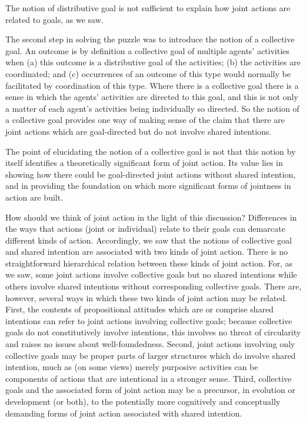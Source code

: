 \documentclass[12pt,a4paper]{extarticle}
\begin{document}
The notion of distributive goal is not sufficient to explain how joint actions are related to goals, as we saw.

The second step in solving the puzzle was to introduce the notion of a collective goal.  An outcome is by definition a collective goal of multiple agents' activities when (a) this outcome is a distributive goal of the activities; (b) the activities are coordinated; and (c)  occurrences of an outcome of this type would normally be facilitated by coordination of this type.  Where there is a collective goal there is a sense in which the agents' activities are directed to this goal, and this is not only a matter of each agent's activities being individually so directed.
So the notion of a collective goal provides one way of making sense of the claim that there are joint actions which are goal-directed but do not involve shared intentions.

The point of elucidating the notion of a collective goal is not that this notion by itself identifies a theoretically significant form of joint action.  Its value lies in showing how there could be goal-directed joint actions without shared intention, and in providing the foundation on which more significant forms of jointness in action are built.


How should we think of joint action in the light of this discussion? 
Differences in the ways that actions (joint or individual) relate to their goals can demarcate different kinds of action.
Accordingly, we saw that the notions of collective goal and shared intention are associated with two kinds of joint action.
There is no straightforward hierarchical relation between these kinds of joint action.  
For, as we saw, some joint actions involve collective goals but no shared intentions while others involve shared intentions without corresponding collective goals.  
There are, however, several ways in which these two kinds of joint action may be related.
First, the contents of propositional attitudes which are or comprise shared intentions can refer to joint actions involving collective goals; because collective goals do not constitutively involve intentions, this involves no threat of circularity and raises no issues about well-foundedness.
Second, joint actions involving only collective goals may be proper parts of larger structures which do involve shared intention, much as (on some views) merely purposive activities can be components of actions that are intentional in a stronger sense.
Third, collective goals and the associated form of joint action may be a precursor, in evolution or development (or both), to the potentially more cognitively and conceptually demanding forms of joint action associated with shared intention.
\end{document}
